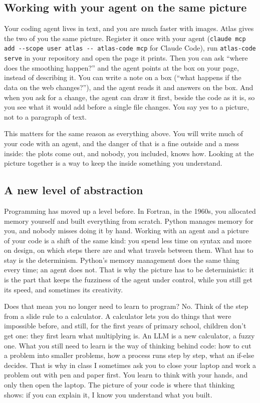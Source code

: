 \documentclass[12pt, a4paper]{article}
\theoremstyle{definition}
\theoremstyle{remark}
\begin{document}
\subsection{Working with your agent on the same picture}
\label{sec:atlas-agent}
Your coding agent lives in text, and you are much faster with images. Atlas gives the two of you the same picture. Register it once with your agent (\texttt{claude mcp add -{}-scope user atlas -{}- atlas-code mcp} for Claude Code), run \texttt{atlas-code serve} in your repository and open the page it prints. Then you can ask ``where does the smoothing happen?'' and the agent points at the box on your page, instead of describing it. You can write a note on a box (``what happens if the data on the web changes?''), and the agent reads it and answers on the box. And when you ask for a change, the agent can draw it first, beside the code as it is, so you see what it would add before a single file changes. You say yes to a picture, not to a paragraph of text.

This matters for the same reason as everything above. You will write much of your code with an agent, and the danger of that is a fine outside and a mess inside: the plots come out, and nobody, you included, knows how. Looking at the picture together is a way to keep the inside something you understand.

\subsection{A new level of abstraction}
\label{sec:atlas-abstraction}
Programming has moved up a level before. In Fortran, in the 1960s, you allocated memory yourself and built everything from scratch. Python manages memory for you, and nobody misses doing it by hand. Working with an agent and a picture of your code is a shift of the same kind: you spend less time on syntax and more on design, on which steps there are and what travels between them. What has to stay is the determinism. Python's memory management does the same thing every time; an agent does not. That is why the picture has to be deterministic: it is the part that keeps the fuzziness of the agent under control, while you still get its speed, and sometimes its creativity.

Does that mean you no longer need to learn to program? No. Think of the step from a slide rule to a calculator. A calculator lets you do things that were impossible before, and still, for the first years of primary school, children don't get one: they first learn what multiplying is. An LLM is a new calculator, a fuzzy one. What you still need to learn is the way of thinking behind code: how to cut a problem into smaller problems, how a process runs step by step, what an if-else decides. That is why in class I sometimes ask you to close your laptop and work a problem out with pen and paper first. You learn to think with your hands, and only then open the laptop. The picture of your code is where that thinking shows: if you can explain it, I know you understand what you built.
\end{document}
